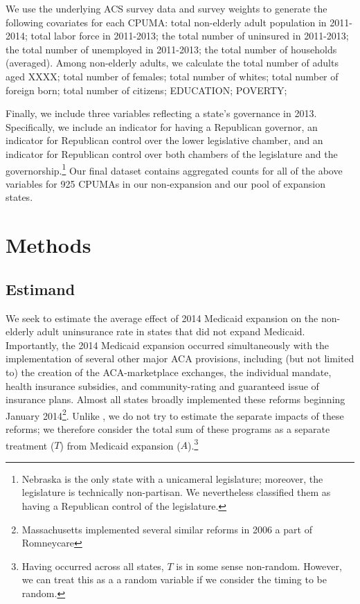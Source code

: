 \documentclass[final]{article}
\begin{document}
We use the underlying ACS survey data and survey weights to generate the following covariates for each CPUMA: total non-elderly adult population in 2011-2014; total labor force in 2011-2013; the total number of uninsured in 2011-2013; the total number of unemployed in 2011-2013; the total number of households (averaged). Among non-elderly adults, we calculate the total number of adults aged XXXX; total number of females; total number of whites; total number of foreign born; total number of citizens; EDUCATION; POVERTY; 

Finally, we include three variables reflecting a state's governance in 2013. Specifically, we include an indicator for having a Republican governor, an indicator for Republican control over the lower legislative chamber, and an indicator for Republican control over both chambers of the legislature and the governorship.\footnote{Nebraska is the only state with a unicameral legislature; moreover, the legislature is technically non-partisan. We nevertheless classified them as having a Republican control of the legislature.} Our final dataset contains aggregated counts for all of the above variables for 925 CPUMAs in our non-expansion and our pool of expansion states.

\section{Methods}

\subsection{Estimand}

We seek to estimate the average effect of 2014 Medicaid expansion on the non-elderly adult uninsurance rate in states that did not expand Medicaid. Importantly, the 2014 Medicaid expansion occurred simultaneously with the implementation of several other major ACA provisions, including (but not limited to) the creation of the ACA-marketplace exchanges, the individual mandate, health insurance subsidies, and community-rating and guaranteed issue of insurance plans. Almost all states broadly implemented these reforms beginning January 2014\footnote{Massachusetts implemented several similar reforms in 2006 a part of Romneycare}. Unlike \cite{frean2017premium}, we do not try to estimate the separate impacts of these reforms; we therefore consider the total sum of these programs as a separate treatment ($T$) from Medicaid expansion ($A$).\footnote{Having occurred across all states, $T$ is in some sense non-random. However, we can treat this as a a random variable if we consider the timing to be random.}
\end{document}
